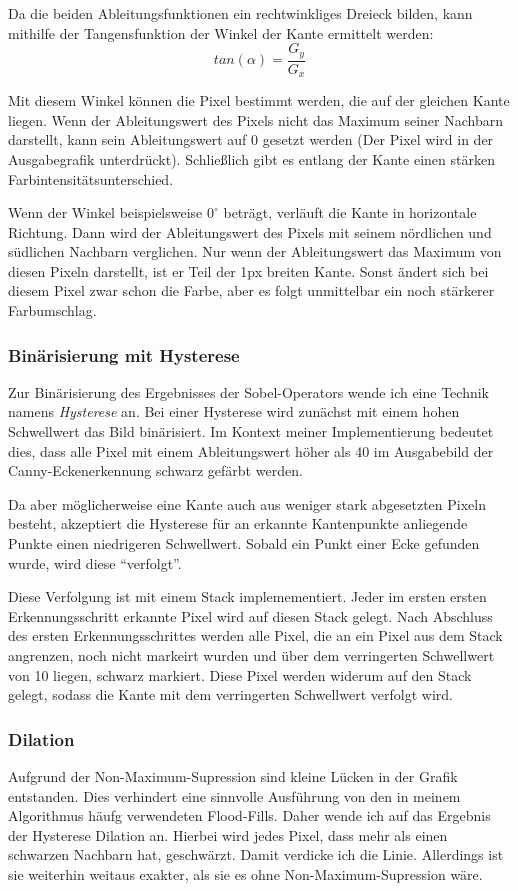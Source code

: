 Da die beiden Ableitungsfunktionen ein rechtwinkliges Dreieck bilden, kann mithilfe der Tangensfunktion der Winkel der Kante ermittelt werden:
\begin{equation}
	tan(\alpha) = \frac{G_y}{G_x}
\end{equation}

Mit diesem Winkel können die Pixel bestimmt werden, die auf der gleichen Kante liegen. Wenn der Ableitungswert des Pixels nicht das Maximum seiner Nachbarn darstellt, kann sein Ableitungswert auf 0 gesetzt werden (Der Pixel wird in der Ausgabegrafik unterdrückt). Schließlich gibt es entlang der Kante einen stärken Farbintensitätsunterschied.  

Wenn der Winkel beispielsweise \(0^{\circ}\) beträgt, verläuft die Kante in horizontale Richtung. Dann wird der Ableitungswert des Pixels mit seinem nördlichen und südlichen Nachbarn verglichen.
Nur wenn der Ableitungswert das Maximum von diesen Pixeln darstellt, ist er Teil der 1px breiten Kante. Sonst ändert sich bei diesem Pixel zwar schon die Farbe, aber es folgt unmittelbar ein noch stärkerer Farbumschlag.

\subsubsection{Binärisierung mit Hysterese}
Zur Binärisierung des Ergebnisses der Sobel-Operators wende ich eine Technik namens \textit{Hysterese} an. Bei einer Hysterese wird zunächst mit einem hohen Schwellwert das Bild binärisiert. 
Im Kontext meiner Implementierung bedeutet dies, dass alle Pixel mit einem Ableitungswert höher als 40 im Ausgabebild der Canny-Eckenerkennung schwarz gefärbt werden.

Da aber möglicherweise eine Kante auch aus weniger stark abgesetzten Pixeln besteht, akzeptiert die Hysterese für an erkannte Kantenpunkte anliegende Punkte einen niedrigeren Schwellwert. Sobald ein Punkt einer Ecke gefunden wurde, wird diese "`verfolgt"'.

Diese Verfolgung ist mit einem Stack implemementiert. Jeder im ersten ersten Erkennungsschritt erkannte Pixel wird auf diesen Stack gelegt. Nach Abschluss des ersten Erkennungsschrittes werden alle Pixel, die an ein Pixel aus dem Stack angrenzen, noch nicht markeirt wurden und über dem verringerten Schwellwert von 10 liegen, schwarz markiert. Diese Pixel werden widerum auf den Stack gelegt, sodass die Kante mit dem verringerten Schwellwert verfolgt wird. 

\subsubsection{Dilation}
Aufgrund der Non-Maximum-Supression sind kleine Lücken in der Grafik entstanden. Dies verhindert eine sinnvolle Ausführung von den in meinem Algorithmus häufg verwendeten Flood-Fills. Daher wende ich auf das Ergebnis der Hysterese Dilation an. Hierbei wird jedes Pixel, dass mehr als einen schwarzen Nachbarn hat, geschwärzt.
Damit verdicke ich die Linie. Allerdings ist sie weiterhin weitaus exakter, als sie es ohne Non-Maximum-Supression wäre.

